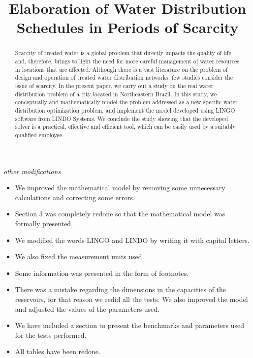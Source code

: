 \documentclass{singlecol}
\theoremstyle{TH}{
\newtheorem{lemma}{Lemma}
\newtheorem{theorem}[lemma]{Theorem}
\newtheorem{corrolary}[lemma]{Corrolary}
\newtheorem{conjecture}[lemma]{Conjecture}
\newtheorem{proposition}[lemma]{Proposition}
\newtheorem{claim}[lemma]{Claim}
\newtheorem{stheorem}[lemma]{Wrong Theorem}
\newtheorem{algorithm}{Algorithm}
}
\theoremstyle{THrm}{
\newtheorem{definition}{Definition}[section]
\newtheorem{question}{Question}[section]
\newtheorem{remark}{Remark}
\newtheorem{scheme}{Scheme}
}
\theoremstyle{THhit}{
\newtheorem{case}{Case}[section]
}
\begin{document}
\emph{other modifications}

\begin{itemize}
\item We improved the mathematical model by removing some unnecessary calculations and correcting some errors.
\item Section 3 was completely redone so that the mathematical model was formally presented.
\item We modified the words LINGO and LINDO by writing it with capital letters.
\item We also fixed the measurement units used.
\item Some information was presented in the form of footnotes.
\item There was a mistake regarding the dimensions in the capacities of the reservoirs, for that reason we redid all the tests. We also improved the model and adjusted the values of the parameters used.
\item We have included a section to present the benchmarks and parameters used for the tests performed.
\item All tables have been redone.
\end{itemize}

\newpage

\setcounter{page}{1}






\BottomCatch

\CLline

\subtitle{}

\title{Elaboration of Water Distribution Schedules in Periods of Scarcity}

\begin{abstract}

Scarcity of treated water is a global problem that directly impacts the quality of life and, therefore, brings to light the need for more careful management of water resources in locations that are affected. Although there is a vast literature on the problem of design and operation of treated water distribution networks, few studies consider the issue of scarcity. In the present paper, we carry out a study on the real water distribution problem of a city located in Northeastern Brazil. In this study, we conceptually and mathematically model the problem addressed as a new specific water distribution optimization problem, and implement the model developed using LINGO software from LINDO Systems. We conclude the study showing that the developed solver is a practical, effective and efficient tool, which can be easily used by a suitably qualified employee.
\end{abstract}
\end{document}

